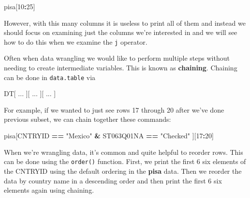 \documentclass[]{book}
\newenvironment{Shaded}{\begin{snugshade}}{\end{snugshade}}
\newcommand{\DecValTok}[1]{\textcolor[rgb]{0.00,0.00,0.81}{#1}}
\newcommand{\KeywordTok}[1]{\textcolor[rgb]{0.13,0.29,0.53}{\textbf{#1}}}
\newcommand{\NormalTok}[1]{#1}
\newcommand{\OperatorTok}[1]{\textcolor[rgb]{0.81,0.36,0.00}{\textbf{#1}}}
\newcommand{\StringTok}[1]{\textcolor[rgb]{0.31,0.60,0.02}{#1}}
\begin{document}
\begin{Shaded}
\begin{Highlighting}[]
\NormalTok{pisa[}\DecValTok{10}\OperatorTok{:}\DecValTok{25}\NormalTok{]}
\end{Highlighting}
\end{Shaded}

However, with this many columns it is useless to print all of them and instead we should focus on examining just the columns we're interested in and we will see how to do this when we examine the \texttt{j} operator.

Often when data wrangling we would like to perform multiple steps without needing to create intermediate variables. This is known as \textbf{chaining}. Chaining can be done in \texttt{data.table} via

\begin{Shaded}
\begin{Highlighting}[]
\NormalTok{DT[ ...}
\NormalTok{   ][ ...}
\NormalTok{     ][ ...}
\NormalTok{       ]}
\end{Highlighting}
\end{Shaded}

For example, if we wanted to just see rows 17 through 20 after we've done previous subset, we can chain together these commands:

\begin{Shaded}
\begin{Highlighting}[]
\NormalTok{pisa[CNTRYID }\OperatorTok{==}\StringTok{ "Mexico"} \OperatorTok{&}\StringTok{ }\NormalTok{ST063Q01NA }\OperatorTok{==}\StringTok{ "Checked"}
\NormalTok{     ][}\DecValTok{17}\OperatorTok{:}\DecValTok{20}\NormalTok{]}
\end{Highlighting}
\end{Shaded}

When we're wrangling data, it's common and quite helpful to reorder rows. This can be done using the \texttt{order()} function. First, we print the first 6 six elements of the CNTRYID using the default ordering in the \textbf{pisa} data. Then we reorder the data by country name in a descending order and then print the first 6 six elements again using chaining.

\begin{Shaded}
\end{Shaded}
\end{document}
